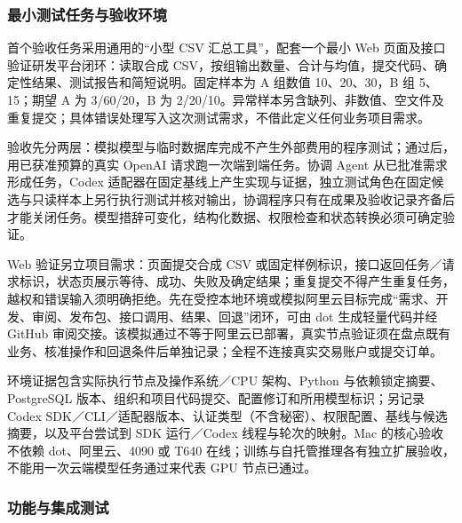 \documentclass[11pt,a4paper]{article}
\begin{document}
\subsubsection{最小测试任务与验收环境}

首个验收任务采用通用的“小型 CSV 汇总工具”，配套一个最小 Web 页面及接口验证研发平台闭环：读取合成 CSV，按组输出数量、合计与均值，提交代码、确定性结果、测试报告和简短说明。固定样本为 A 组数值 10、20、30，B 组 5、15；期望 A 为 3/60/20，B 为 2/20/10。异常样本另含缺列、非数值、空文件及重复提交；具体错误处理写入这次测试需求，不借此定义任何业务项目需求。

验收先分两层：模拟模型与临时数据库完成不产生外部费用的程序测试；通过后，用已获准预算的真实 OpenAI 请求跑一次端到端任务。协调 Agent 从已批准需求形成任务，Codex 适配器在固定基线上产生实现与证据，独立测试角色在固定候选与只读样本上另行执行测试并核对输出，协调程序只有在成果及验收记录齐备后才能关闭任务。模型措辞可变化，结构化数据、权限检查和状态转换必须可确定验证。

Web 验证另立项目需求：页面提交合成 CSV 或固定样例标识，接口返回任务／请求标识，状态页展示等待、成功、失败及确定结果；重复提交不得产生重复任务，越权和错误输入须明确拒绝。先在受控本地环境或模拟阿里云目标完成“需求、开发、审阅、发布包、接口调用、结果、回退”闭环，可由 dot 生成轻量代码并经 GitHub 审阅交接。该模拟通过不等于阿里云已部署，真实节点验证须在盘点既有业务、核准操作和回退条件后单独记录；全程不连接真实交易账户或提交订单。

环境证据包含实际执行节点及操作系统／CPU 架构、Python 与依赖锁定摘要、PostgreSQL 版本、组织和项目代码提交、配置修订和所用模型标识；另记录 Codex SDK／CLI／适配器版本、认证类型（不含秘密）、权限配置、基线与候选摘要，以及平台尝试到 SDK 运行／Codex 线程与轮次的映射。Mac 的核心验收不依赖 dot、阿里云、4090 或 T640 在线；训练与自托管推理各有独立扩展验收，不能用一次云端模型任务通过来代表 GPU 节点已通过。

\subsubsection{功能与集成测试}
\end{document}
